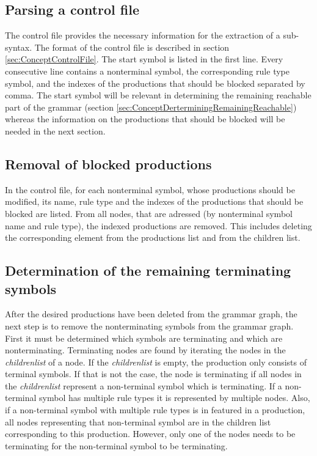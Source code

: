 \subsection{Parsing a control file}\label{sec:ConceptParsingControlFile}
The control file provides the necessary information for the extraction of a sub-syntax.
The format of the control file is described in section \ref{sec:ConceptControlFile}. 
The start symbol is listed in the first line.
Every consecutive line contains a nonterminal symbol, the corresponding rule type symbol, and the indexes of the productions that should be blocked separated by comma.
The start symbol will be relevant in determining the remaining reachable part of the grammar (section \ref{sec:ConceptDerterminingRemainingReachable}) whereas the information on the productions that should be blocked will be needed in the next section.

\subsection{Removal of blocked productions}\label{sec:ConceptRemovingBlockedProductions}
In the control file, for each nonterminal symbol, whose productions should be modified, its name, rule type and the indexes of the productions that should be blocked are listed.
From all nodes, that are adressed (by nonterminal symbol name and rule type), the indexed productions are removed.
This includes deleting the corresponding element from the productions list and from the children list.

\subsection{Determination of the remaining terminating symbols}\label{sec:ConceptDerterminingRemainingTerminating}
After the desired productions have been deleted from the grammar graph, the next step is to remove the nonterminating symbols from the grammar graph.
First it must be determined which symbols are terminating and which are nonterminating.
Terminating nodes are found by iterating the nodes in the \textit{children\textunderscore list} of a node.
If the \textit{children\textunderscore list} is empty, the production only consists of terminal symbols.
If that is not the case, the node is terminating if all nodes in the \textit{children\textunderscore list} represent a non-terminal symbol which is terminating.
If a non-terminal symbol has multiple rule types it is represented by multiple nodes. Also, if a non-terminal symbol with multiple rule types is in featured in a production, all nodes representing that non-terminal symbol are in the children list corresponding to this production. However, only one of the nodes needs to be terminating for the non-terminal symbol to be terminating.

